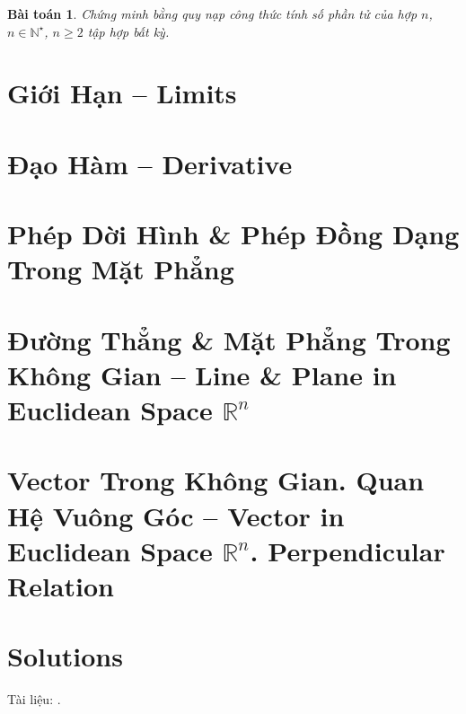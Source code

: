 \documentclass{article}
\numberwithin{equation}{section}
\newtheorem{baitoan}{Bài toán}[section]
\begin{document}
\begin{baitoan}
	Chứng minh bằng quy nạp công thức tính số phần tử của hợp $n$, $n\in\mathbb{N}^\star$, $n\ge 2$ tập hợp bất kỳ.
\end{baitoan}


\section{Giới Hạn -- Limits}


\section{Đạo Hàm -- Derivative}


\section{Phép Dời Hình \& Phép Đồng Dạng Trong Mặt Phẳng}


\section{Đường Thẳng \& Mặt Phẳng Trong Không Gian -- Line \& Plane in Euclidean Space $\mathbb{R}^n$}


\section{Vector Trong Không Gian. Quan Hệ Vuông Góc -- Vector in Euclidean Space $\mathbb{R}^n$. Perpendicular Relation}


\section{Solutions}


Tài liệu: \cite{SGK_Toan_11_dai_so_giai_tich_co_ban, SGK_Toan_11_dai_so_giai_tich_nang_cao, SGK_Toan_11_hinh_hoc_co_ban, SGK_Toan_11_hinh_hoc_nang_cao, TL_chuyen_Toan_Dai_So_Giai_Tich_11, TL_chuyen_Toan_Hinh_Hoc_11}.

\printbibliography[heading=bibintoc]
	
\end{document}
